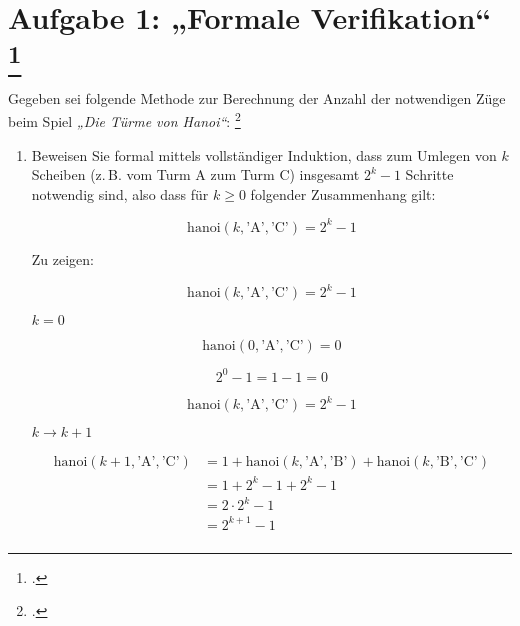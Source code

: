 \documentclass{lehramt-informatik-aufgabe}
\begin{document}
\section{Aufgabe 1: „Formale Verifikation“
\footcite[Thema 2 Teilaufgabe 1 Aufgabe 1]{examen:46116:2014:03}}

Gegeben sei folgende Methode zur Berechnung der Anzahl der notwendigen
Züge beim Spiel \emph{„Die Türme von Hanoi“}:
\footcite{sosy:pu:5:1}


\begin{enumerate}


\item Beweisen Sie formal mittels vollständiger Induktion, dass zum
Umlegen von $k$ Scheiben (z.\,B. vom Turm A zum Turm C) insgesamt
$2^k-1$ Schritte notwendig sind, also dass für $k \geq 0$ folgender
Zusammenhang gilt:

\begin{displaymath}
\text{hanoi}(k,\text{'A'},\text{'C'}) = 2^k - 1
\end{displaymath}

\begin{antwort}
Zu zeigen:

\begin{displaymath}
\text{hanoi}(k,\text{'A'},\text{'C'}) = 2^k - 1
\end{displaymath}

%

 $k=0$

\begin{displaymath}
\text{hanoi}(0,\text{'A'},\text{'C'}) = 0
\end{displaymath}

\begin{displaymath}
2^0 - 1 = 1 - 1 = 0
\end{displaymath}

%


\begin{displaymath}
\text{hanoi}(k,\text{'A'},\text{'C'}) = 2^k - 1
\end{displaymath}

%

 $k \rightarrow k + 1$

\begin{align*}
\text{hanoi}(k +  1, \text{'A'},\text{'C'})
& = 1 + \text{hanoi}(k, \text{'A'},\text{'B'}) + \text{hanoi}(k, \text{'B'},\text{'C'})\\
& = 1 + 2^k - 1 +  2^k - 1 \\
& = 2 \cdot 2^k - 1 \\
& = 2^{k+1} - 1 \\
\end{align*}


\end{antwort}
\end{enumerate}
\end{document}
